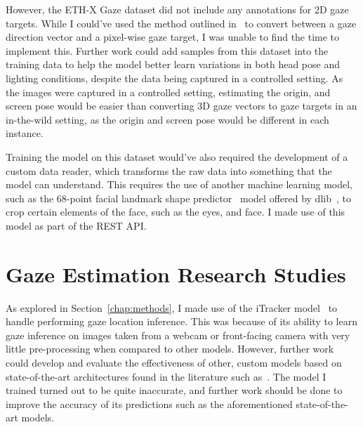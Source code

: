 \documentclass{report}
\begin{document}
However, the ETH-X Gaze dataset did not include any annotations for 2D gaze targets. While I could've used the method outlined in~\cite{zhang15cvpr} to convert between a gaze direction vector and a pixel-wise gaze target, I was unable to find the time to implement this. Further work could add samples from this dataset into the training data to help the model better learn variations in both head pose and lighting conditions, despite the data being captured in a controlled setting. As the images were captured in a controlled setting, estimating the origin, and screen pose would be easier than converting 3D gaze vectors to gaze targets in an in-the-wild setting, as the origin and screen pose would be different in each instance. 

Training the model on this dataset would've also required the development of a custom data reader, which transforms the raw data into something that the model can understand. This requires the use of another machine learning model, such as the 68-point facial landmark shape predictor~\cite{king2015models} model offered by dlib~\cite{king2009dlib}, to crop certain elements of the face, such as the eyes, and face. I made use of this model as part of the REST API.

\section{Gaze Estimation Research Studies}

As explored in Section~\ref{chap:methods}, I made use of the iTracker model~\cite{krafka2016eye} to handle performing gaze location inference. This was because of its ability to learn gaze inference on images taken from a webcam or front-facing camera with very little pre-processing when compared to other models. However, further work could develop and evaluate the effectiveness of other, custom models based on state-of-the-art architectures found in the literature such as~\cite{seonwook2019fewshot,tafasca2023sharingan}. The model I trained turned out to be quite inaccurate, and further work should be done to improve the accuracy of its predictions such as the aforementioned state-of-the-art models. 
\end{document}
